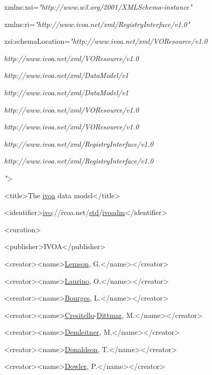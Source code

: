 \documentclass[10pt,a4paper]{ivoa}
\begin{document}
xmlns:xsi=\emph{"http://www.w3.org/2001/XMLSchema-instance"}

xmlns:ri=\emph{"http://www.ivoa.net/xml/RegistryInterface/v1.0"}

xsi:schemaLocation=\emph{"http://www.ivoa.net/xml/VOResource/v1.0}

\emph{http://www.ivoa.net/xml/VOResource/v1.0}

\emph{http://www.ivoa.net/xml/DataModel/v1}

\emph{http://www.ivoa.net/xml/DataModel/v1}

\emph{http://www.ivoa.net/xml/VOResource/v1.0}

\emph{http://www.ivoa.net/xml/VOResource/v1.0}

\emph{http://www.ivoa.net/xml/RegistryInterface/v1.0}

\emph{http://www.ivoa.net/xml/RegistryInterface/v1.0}

\emph{"}\textgreater{}

\textless title\textgreater The \uline{ivoa} data
model\textless/title\textgreater{}

\textless identifier\textgreater{}\uline{ivo}://ivoa.net/\uline{std}/\uline{ivoadm}\textless/identifier\textgreater{}

\textless curation\textgreater{}

\textless publisher\textgreater IVOA\textless/publisher\textgreater{}

\textless creator\textgreater\textless name\textgreater{}\uline{Lemson},
G.\textless/name\textgreater\textless/creator\textgreater{}

\textless creator\textgreater\textless name\textgreater{}\uline{Laurino},
O.\textless/name\textgreater\textless/creator\textgreater{}

\textless creator\textgreater\textless name\textgreater{}\uline{Bourges},
L.\textless/name\textgreater\textless/creator\textgreater{}

\textless creator\textgreater\textless name\textgreater{}\uline{Cresitello}-\uline{Dittmar},
M.\textless/name\textgreater\textless/creator\textgreater{}

\textless creator\textgreater\textless name\textgreater{}\uline{Demleitner},
M.\textless/name\textgreater\textless/creator\textgreater{}

\textless creator\textgreater\textless name\textgreater{}\uline{Donaldson},
T.\textless/name\textgreater\textless/creator\textgreater{}

\textless creator\textgreater\textless name\textgreater{}\uline{Dowler},
P.\textless/name\textgreater\textless/creator\textgreater{}
\end{document}
